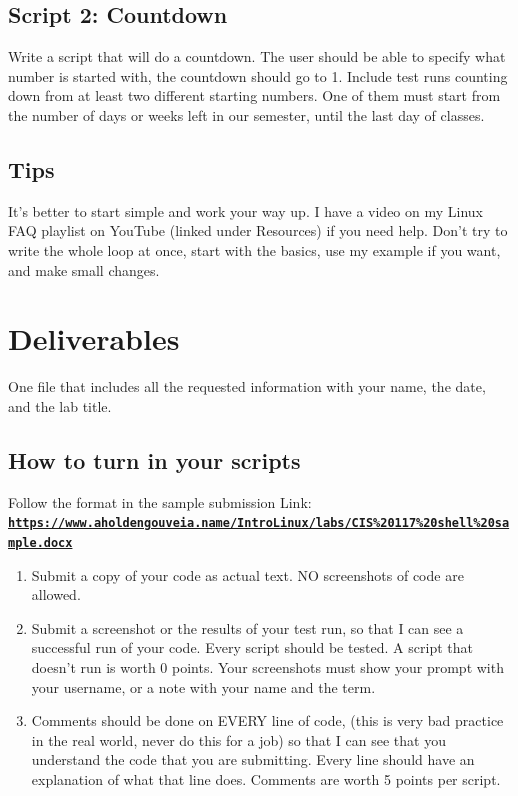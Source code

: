 \documentclass[12pt]{article}
\begin{document}
\subsection*{Script 2: Countdown}
Write a script that will do a countdown. The user should be able to specify what number is started with, the countdown should go to 1. Include test runs counting down from at least two different starting numbers. One of them must start from the number of days or weeks left in our semester, until the last day of classes.

\subsection*{Tips}
It's better to start simple and work your way up.  I have a video on my Linux FAQ playlist on YouTube (linked under Resources) if you need help. Don't try to write the whole loop at once, start with the basics, use my example if you want, and make small changes.

\section*{Deliverables}
One file that includes all the requested information with your name, the date, and the lab title.

\subsection*{How to turn in your scripts}
Follow the format in the sample submission Link: \href{https://www.aholdengouveia.name/IntroLinux/labs/CIS\%20117\%20shell\%20sample.docx}{\textbf{\nolinkurl{https://www.aholdengouveia.name/IntroLinux/labs/CIS\%20117\%20shell\%20sample.docx}}}
    \begin{enumerate}
        \item Submit a copy of your code as actual text. NO screenshots of code are allowed.
        \item Submit a screenshot or the results of your test run, so that I can see a successful run of your code. Every script should be tested.  A script that doesn't run is worth 0 points. Your screenshots must show your prompt with your username, or a note with your name and the term.
        \item Comments should be done on EVERY line of code, (this is very bad practice in the real world, never do this for a job) so that I can see that you understand the code that you are submitting. Every line should have an explanation of what that line does.  Comments are worth 5 points per script.
\end{enumerate}
\end{document}
